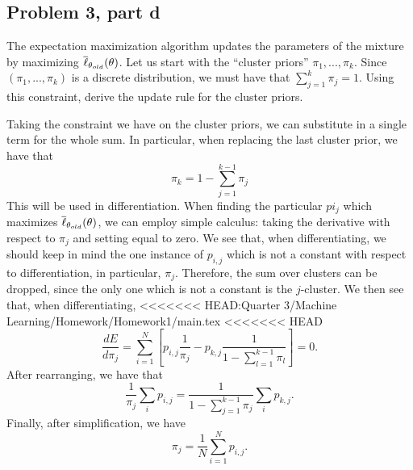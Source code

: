 \subsection{Problem 3, part d}
The expectation maximization algorithm updates the parameters of the mixture by maximizing $\overline{\ell}_{\theta_{old}}(\theta)$. Let us start with the ``cluster priors'' $\pi_1, ..., \pi_k.$ Since $(\pi_1, ..., \pi_k)$ is a discrete distribution, we must have that $\sum_{j = 1}^k \pi_j = 1$. Using this constraint, derive the update rule for the cluster priors. 
\partbreak
\begin{solution}

    Taking the constraint we have on the cluster priors, we can substitute in a single term for the whole sum. In particular, when replacing the last cluster prior, we have that 
    \[\pi_k = 1 - \sum_{j = 1}^{k-1} \pi_j\]
    This will be used in differentiation. When finding the particular $pi_j$ which maximizes $\overline{\ell}_{\theta_{old}}(\theta)$, we can employ simple calculus: taking the derivative with respect to $\pi_j$ and setting equal to zero. We see that, when differentiating, we should keep in mind the one instance of $p_{i, j}$ which is not a constant with respect to differentiation, in particular, $\pi_j$. Therefore, the sum over clusters can be dropped, since the only one which is not a constant is the $j$-cluster. We then see that, when differentiating, 
<<<<<<< HEAD:Quarter 3/Machine Learning/Homework/Homework1/main.tex
<<<<<<< HEAD
    \[\frac{d E}{d\pi_j} = \sum_{i = 1}^N \left[p_{i, j}\frac{1}{\pi_j} - p_{k, j}\frac{1}{1 - \sum_{l = 1}^{k-1} \pi_l}\right] = 0.\]
    After rearranging, we have that
    \[\frac{1}{\pi_j}\sum_i p_{i, j} = \frac{1}{1 - \sum_{j = 1}^{k-1} \pi_j}\sum_i p_{k, j}. \]
    Finally, after simplification, we have
    \[\pi_j = \frac{1}{N}\sum_{i = 1}^N p_{i, j}.\]
    
\end{solution}


\newpage

